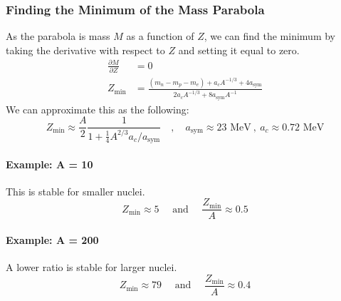 \documentclass{article}
\begin{document}
\subsubsection{Finding the Minimum of the Mass Parabola}
As the parabola is mass $M$ as a function of $Z$, we can find the minimum by taking the derivative with respect to $Z$ and setting it equal to zero.
\begin{align}
\frac{∂ M}{∂ Z} &= 0 \\
Z_{\text{min}} &= \frac{(m_n - m_p - m_e)+a_cA^{-1 / 3} + 4a_{\text{sym}}}{2a_{c} A^{-1 / 3} + 8a_{\text{sym}}A^{-1}}
\end{align}
We can approximate this as the following:
\begin{equation}
Z_{\text{min}} ≈ \frac{A}{2} \frac{1}{1 + \frac{1}{4}A^{2/3}a_c / a_{\text{sym}}} \quad , \quad  a_{\text{sym}} ≈ 23 \text{ MeV} \ , \ a_c ≈ 0.72 \text{ MeV}
\end{equation}

\paragraph{Example: A = 10}
This is stable for smaller nuclei. 
\begin{equation}
Z_{\text{min}} ≈ 5 \quad \text{ and } \quad  \frac{Z_{\text{min}}}{A} ≈ 0.5
\end{equation}

\paragraph{Example: A = 200}
A lower ratio is stable for larger nuclei.
\begin{equation}
Z_{\text{min}} ≈ 79 \quad \text{ and } \quad  \frac{Z_{\text{min}}}{A} ≈ 0.4
\end{equation}
\end{document}

